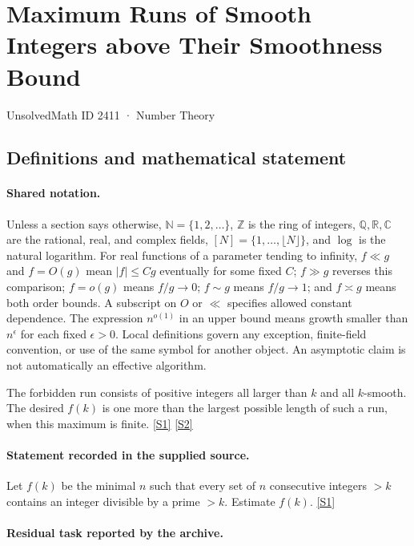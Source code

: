 \documentclass[11pt,a4paper]{article}
\newcommand{\N}{\mathbb{N}}
\newcommand{\Z}{\mathbb{Z}}
\newcommand{\Q}{\mathbb{Q}}
\newcommand{\R}{\mathbb{R}}
\newcommand{\C}{\mathbb{C}}
\newcommand{\sref}[2]{\hyperlink{source:#1:#2}{[S#2]}}
\begin{document}

\setcounter{section}{2410}

\section{Maximum Runs of Smooth Integers above Their Smoothness Bound}\label{2411}

{\small\sffamily UnsolvedMath ID 2411 · Number Theory}

\subsection{Definitions and mathematical statement}

\paragraph{Shared notation.}Unless a section says otherwise, $\N=\{1,2,\ldots\}$,
$\Z$ is the ring of integers, $\Q,\R,\C$ are the rational, real, and complex
fields, $[N]=\{1,\ldots,\lfloor N\rfloor\}$, and $\log$ is the natural
logarithm. For real functions of a parameter tending to infinity,
$f\ll g$ and $f=O(g)$ mean $|f|\leq Cg$ eventually for some fixed $C$;
$f\gg g$ reverses this comparison; $f=o(g)$ means $f/g\to0$;
$f\sim g$ means $f/g\to1$; and $f\asymp g$ means both order bounds.
A subscript on $O$ or $\ll$ specifies allowed constant dependence.
The expression $n^{o(1)}$ in an upper bound means growth smaller than
$n^\epsilon$ for each fixed $\epsilon>0$. Local definitions govern any
exception, finite-field convention, or use of the same symbol for another
object. An asymptotic claim is not automatically an effective algorithm.



The forbidden run consists of positive integers all larger than $k$ and all $k$-smooth. The desired $f(k)$ is one more than the largest possible length of such a run, when this maximum is finite. \sref{2411}{1} \sref{2411}{2}

\paragraph{Statement recorded in the supplied source.}
Let $f(k)$ be the minimal $n$ such that every set of $n$ consecutive integers $>k$ contains an integer divisible by a prime $>k$. Estimate $f(k)$. \sref{2411}{1}

\paragraph{Residual task reported by the archive.}
\end{document}
